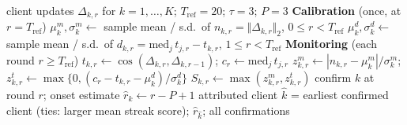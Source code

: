 \begin{algorithm}[t]
\caption{FedTrace v3 forensic monitor (frozen; evaluated, not proposed)}
\label{alg:fedtrace}
\begin{algorithmic}[1]
\Require client updates $\Delta_{k,r}$ for $k=1,\dots,K$; $T_{\mathrm{ref}}=20$; $\tau=3$; $P=3$
\Statex \textbf{Calibration} (once, at $r=T_{\mathrm{ref}}$)
  \State $\mu^m_k,\sigma^m_k \gets$ sample mean / s.d.\ of $n_{k,r}=\Vert\Delta_{k,r}\Vert_2$, $0\le r<T_{\mathrm{ref}}$
  \State $\mu^d_k,\sigma^d_k \gets$ sample mean / s.d.\ of $d_{k,r}=\mathrm{med}_j\,t_{j,r}-t_{k,r}$, $1\le r<T_{\mathrm{ref}}$
\EndFor
\Statex \textbf{Monitoring} (each round $r\ge T_{\mathrm{ref}}$)
  \State $t_{k,r}\gets\cos(\Delta_{k,r},\Delta_{k,r-1})$;\; $c_r\gets\mathrm{med}_{j}\,t_{j,r}$ 
  \State $z^m_{k,r}\gets|n_{k,r}-\mu^m_k|/\sigma^m_k$;\; $z^t_{k,r}\gets\max\{0,(c_r-t_{k,r}-\mu^d_k)/\sigma^d_k\}$
  \State $S_{k,r}\gets\max(z^m_{k,r},z^t_{k,r})$
    \State confirm $k$ at round $r$; onset estimate $\hat r_k\gets r-P+1$
  \EndIf
\EndFor
\State \Return attributed client $\hat k$ = earliest confirmed client (ties: larger mean streak score); $\hat r_{\hat k}$; all confirmations
\end{algorithmic}
\end{algorithm}
